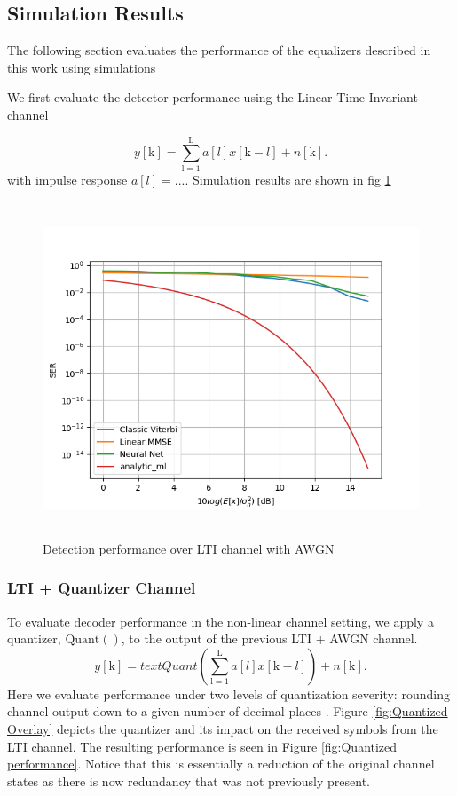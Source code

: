 \documentclass[12pt,a4paper]{report}
\begin{document}
\subsection{Simulation Results}
The following section evaluates the performance of the equalizers described in this work using simulations
\par
We first evaluate the detector performance using the Linear Time-Invariant channel

\begin{equation*}
y[\text{k}] = \sum_{\mathrm{l=1}}^{\mathrm{L}} a[l]x[\text{k}-l] + n[\text{k}].
\end{equation*}
with impulse response $a[l] = ...$.
Simulation results are shown in fig \ref{fig:LTI performance}
\begin{figure}[H]
	\includegraphics[width=\textwidth,height = 10cm]{results/lti_normal}
		  \caption{Detection performance over LTI channel with AWGN}
	  \label{fig:LTI performance}
\end{figure}

\subsubsection{LTI + Quantizer Channel}

To evaluate decoder performance in the non-linear channel setting, we apply a quantizer, $\text{Quant}()$, to the output of the previous LTI + AWGN channel.
\begin{equation*}
y[\text{k}] = text{Quant}(\sum_{\mathrm{l=1}}^{\mathrm{L}} a[l]x[\text{k}-l]) + n[\text{k}].
\end{equation*}
 Here we evaluate performance under two levels of quantization severity: rounding channel output down to a given number of decimal places . Figure \ref{fig:Quantized Overlay} depicts the quantizer and its impact on the received symbols from the LTI channel. The resulting performance is seen in Figure \ref{fig:Quantized performance}. Notice that this is essentially a reduction of the original channel states as there is now redundancy that was not previously present. 
\end{document}
